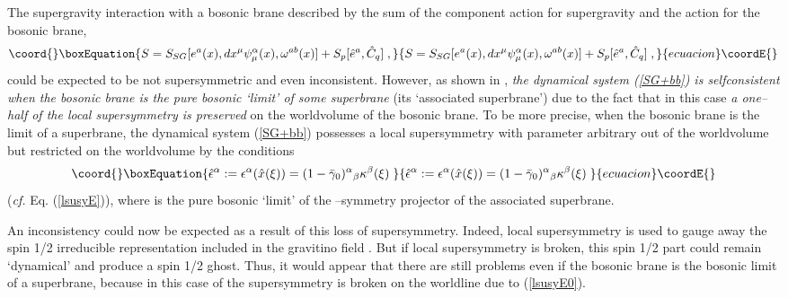 \documentclass[a4paper,11pt]{article}
\begin{document}
The supergravity interaction with a bosonic brane described by the sum of 
the component action for supergravity and the action for the bosonic brane,  
\begin{equation}\coord{}\boxEquation{\label{SG+bb}
S= 
S_{SG}[e^a(x), dx^\mu \psi_\mu^\alpha(x) , \omega^{ab}(x)] + 
S_p[\hat{e}^a, \hat{C}_{q}]
\;  ,
}{S= 
S_{SG}[e^a(x), dx^\mu \psi_\mu^\alpha(x) , \omega^{ab}(x)] + 
S_p[\hat{e}^a, \hat{C}_{q}]
\;  ,
}{ecuacion}\coordE{}\end{equation}
could be expected to be not supersymmetric and even inconsistent. However, 
as shown in  \cite{BdAI1}, {\sl the dynamical system  (\ref{SG+bb}) is 
selfconsistent when the bosonic brane is the pure bosonic `limit' of some 
superbrane} (its `associated superbrane') due to the fact 
that in this case {\sl a one--half of the local supersymmetry 
is preserved} on the worldvolume of the bosonic brane. 
To be more precise, when the bosonic brane is the limit of 
a superbrane, the dynamical system 
(\ref{SG+bb}) possesses a local supersymmetry with parameter 
\coordHE{}  arbitrary out of the worldvolume 
but restricted on the worldvolume by the conditions 
\begin{equation}\coord{}\boxEquation{
  \label{lsusyE0} 
\hat{\epsilon}^{\alpha}:= \epsilon^{\alpha}(\hat{x}(\xi)) 
= (1-\bar{\gamma}_0)^{\alpha}{}_{\beta}\kappa^{\beta}(\xi) \; 
}{
  \hat{\epsilon}^{\alpha}:= \epsilon^{\alpha}(\hat{x}(\xi)) 
= (1-\bar{\gamma}_0)^{\alpha}{}_{\beta}\kappa^{\beta}(\xi) \; 
}{ecuacion}\coordE{}\end{equation}
({\it cf.} Eq. (\ref{lsusyE})), 
where \coordHE{} is the 
pure bosonic `limit' of the \myHighlight{$\kappa$}\coordHE{}--symmetry projector 
of the associated superbrane.

An inconsistency could now be expected as a result of this loss of  
supersymmetry. Indeed, local supersymmetry is used to gauge away the 
spin 1/2 irreducible representation included in  the gravitino field 
\coordHE{}. But if local supersymmetry is broken, this 
spin 1/2 part could remain `dynamical' and produce a spin 1/2 ghost. 
Thus, it would appear that there are still problems even if 
the bosonic brane is the bosonic limit of a superbrane, because 
in this case \coordHE{} of the supersymmetry is broken on the worldline 
due to 
(\ref{lsusyE0}).  
\end{document}
